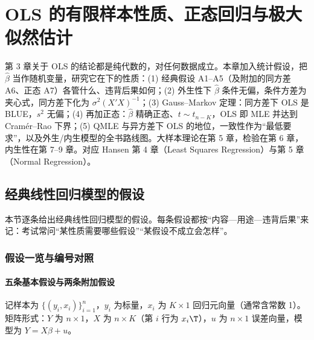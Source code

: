 \chapter{OLS 的有限样本性质、正态回归与极大似然估计}
\label{ch:U04-finite}

第 3 章关于 OLS 的结论都是纯代数的，对任何数据成立。本章加入统计假设，把 $\hat\beta$ 当作随机变量，研究它在下的性质：(1) 经典假设 A1--A5（及附加的同方差 A6、正态 A7）各管什么、违背后果如何；(2) 外生性下 $\hat\beta$ 条件无偏，条件方差为夹心式，同方差下化为 $\sigma^2(X'X)^{-1}$；(3) Gauss--Markov 定理：同方差下 OLS 是 BLUE，$s^2$ 无偏；(4) 再加正态：$\hat\beta$ 精确正态、$t\sim t_{n-K}$，OLS 即 MLE 并达到 Cramér--Rao 下界；(5) QMLE 与异方差下 OLS 的地位，一致性作为“最低要求”，以及外生/内生模型的全书路线图。大样本理论在第 5 章，检验在第 6 章，内生性在第 7--9 章。对应 Hansen 第 4 章（Least Squares Regression）与第 5 章（Normal Regression）。

\section{经典线性回归模型的假设}\label{sec:U04-assump}

本节逐条给出经典线性回归模型的假设。每条假设都按“内容—用途—违背后果”来记：考试常问“某性质需要哪些假设”“某假设不成立会怎样”。

\subsection{假设一览与编号对照}

\subsubsection{五条基本假设与两条附加假设}

记样本为 $\{(y_i,x_i)\}_{i=1}^n$，$y_i$ 为标量，$x_i$ 为 $K\times1$ 回归元向量（通常含常数 1）。矩阵形式：$Y$ 为 $n\times1$，$X$ 为 $n\times K$（第 $i$ 行为 $x_i\T$），$u$ 为 $n\times1$ 误差向量，模型为 $Y=X\beta+u$。

